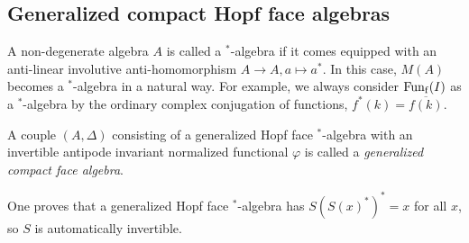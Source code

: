 \subsection{Generalized compact Hopf face algebras}


A non-degenerate algebra $A$ is called a $^*$-algebra if it comes equipped with an anti-linear involutive anti-homomorphism $A\rightarrow A, a\mapsto a^*$. In this case, $M(A)$ becomes a $^*$-algebra in a natural way. For example, we always consider $\mathrm{Fun}_{\operatorname{\mathrm{f}}}(I)$ as a $^*$-algebra by the ordinary complex conjugation of functions, $f^*(k) = \overline{f(k)}$.




\begin{Def} A couple $(A,\Delta)$ consisting of a generalized Hopf face $^*$-algebra with an invertible antipode invariant normalized functional $\varphi$ is called a \emph{generalized compact face algebra}.
\end{Def}

One proves that a generalized Hopf face $^*$-algebra has
$S(S(x)^*)^*=x$ for all $x$, so $S$ is automatically invertible. 


